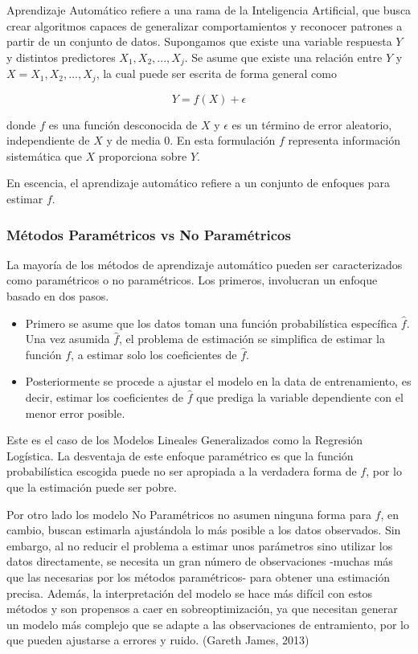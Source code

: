 \documentclass[a4paper,12pt]{Latex/Classes/PhDthesisPSnPDF}
\begin{document}
Aprendizaje Automático refiere a una rama de la Inteligencia Artificial, que busca crear algoritmos capaces de generalizar comportamientos y reconocer patrones a partir de un conjunto de datos. Supongamos que existe una variable respuesta $Y$ y distintos predictores $X_{1}, X_{2}, ..., X_{j}$. Se asume que existe una relación entre $Y$ y $X = X_{1}, X_{2}, ..., X_{j}$, la cual puede ser escrita de forma general como

$$ Y = f(X) + \epsilon $$

donde $f$ es una función desconocida de $X$ y $\epsilon$ es un término de error aleatorio, independiente de $X$ y de media 0. En esta formulación $f$ representa información sistemática que $X$ proporciona sobre $Y$.

En escencia, el aprendizaje automático refiere a un conjunto de enfoques para estimar $f$.

\subsubsection{Métodos Paramétricos vs No Paramétricos}

La mayoría de los métodos de aprendizaje automático pueden ser caracterizados como paramétricos o no paramétricos. Los primeros, involucran un enfoque basado en dos pasos. 
\begin{itemize}
\item Primero se asume que los datos toman una función probabilística específica $\hat{f}$. Una vez asumida $\hat{f}$, el problema de estimación se simplifica de estimar la función $f$, a estimar solo los coeficientes de $\hat{f}$. 
\item Posteriormente se procede a ajustar el modelo en la data de entrenamiento, es decir, estimar los coeficientes de $\hat{f}$ que prediga la variable dependiente con el menor error posible. 
\end{itemize}

Este es el caso de los Modelos Lineales Generalizados como la Regresión Logística. La desventaja de este enfoque paramétrico es que la función probabilística escogida puede no ser apropiada a la verdadera forma de $f$, por lo que la estimación puede ser pobre.

Por otro lado los modelo No Paramétricos no asumen ninguna forma para $f$, en cambio, buscan estimarla ajustándola lo más posible a los datos observados. Sin embargo, al no reducir el problema a estimar unos parámetros sino utilizar los datos directamente, se necesita un gran número de observaciones -muchas más que las necesarias por los métodos paramétricos- para obtener una estimación precisa. Además, la interpretación del modelo se hace más difícil con estos métodos y son propensos a caer en sobreoptimización, ya que necesitan generar un modelo más complejo que se adapte a las observaciones de entramiento, por lo que pueden ajustarse a errores y ruido. (Gareth James, 2013)
\end{document}

